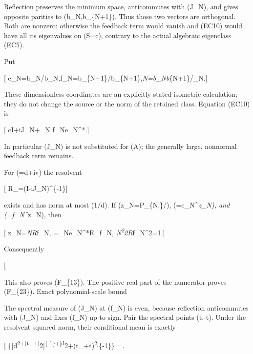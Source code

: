 Reflection preserves the minimum space, anticommutes with (\mathsf J\_N), and gives opposite parities to (\widehat b\_N,\widehat b\_\{N+1\}). Thus those two vectors are orthogonal. Both are nonzero: otherwise the feedback term would vanish and (EC10) would have all its eigenvalues on (S=c), contrary to the actual algebraic eigenclass (EC5).

Put

{[} e\_N=\widehat b\_N/\textbar{}\widehat b\_N\textbar,\quad f\_N=\widehat b\_\{N+1\}/\textbar{}\widehat b\_\{N+1\}\textbar,\quad \epsilon\emph{N=\textbar{}\widehat b\_N\textbar\textbar{}\widehat b}\{N+1\}\textbar/\omega\_N.{]}

These dimensionless coordinates are an explicitly stated isometric calculation; they do not change the source or the norm of the retained class. Equation (EC10) is

{[} cI+i\mathsf J\_N+\epsilon\_N f\_Ne\_N\^{}*.{]}

In particular (\mathsf J\_N) is not substituted for (A); the generally large, nonnormal feedback term remains.

For (\mu=d+iv) the resolvent

{[} \mathcal R\_\mu=(\mu I-i\mathsf J\_N)\^{}\{-1\}{]}

exists and has norm at most (1/d). If (z\_N=P\_\{N,\lambda\}/), (\alpha=e\_N\^{}\emph{z\_N), and (\beta=f\_N\^{}}z\_N), then

{[} z\_N=\epsilon\emph{N\alpha\mathcal R}\mu f\_N, =\epsilon\_Ne\_N\^{}*\mathcal R\_\mu f\_N, \quad \epsilon\emph{N\textsuperscript{2\textbar{}\alpha\textbar{}}2\textbar{}\mathcal R}\mu f\_N\textbar\^{}2=1.{]}

Consequently

{[}  \tag{EC11}{]}

This also proves (F\_\{13\}). The positive real part of the numerator proves (F\_\{23\}). Exact polynomial-scale bound

The spectral measure of (\mathsf J\_N) at (f\_N) is even, because reflection anticommutes with (\mathsf J\_N) and fixes (f\_N) up to sign. Pair the spectral points (t,-t). Under the resolvent squared norm, their conditional mean is exactly

{[}  \{{[}d\textsuperscript{2+(t\_\lambda-t)}2{]}\textsuperscript{\{-1\}+{[}d}2+(t\_\lambda+t)\textsuperscript{2{]}}\{-1\}\} =. \tag{EC12}{]}

